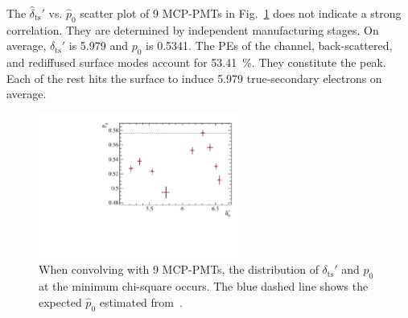 The $\hat{\delta}_{\mathrm{ts}}'$ vs. $\hat{p}_0$ scatter plot
of 9 MCP-PMTs in Fig.~\ref{fig:true_p} does not indicate a strong correlation.
They are determined by independent manufacturing stages.
On average, $\delta_{\mathrm{ts}}'$ is 5.979 and $p_0$ is 0.5341. %
The PEs of the channel, back-scattered, and rediffused surface modes account for \SI{53.41}{\percent}.
They constitute the peak. Each of the rest hits the surface
to induce 5.979 true-secondary electrons on average.

\begin{figure}[!htbp]
	\centering
	\includegraphics[width=0.6\textwidth]{PMTRelated/GTmodel/true_p.pdf}
	\caption{When convolving with 9 MCP-PMTs,
		the distribution of $\delta_{\mathrm{ts}}'$ and $p_0$ at the minimum chi-square
		occurs. The blue dashed line shows the expected $\hat{p}_0$ estimated from~\cite{chen2018photoelectron}.}
	\label{fig:true_p}
\end{figure}

